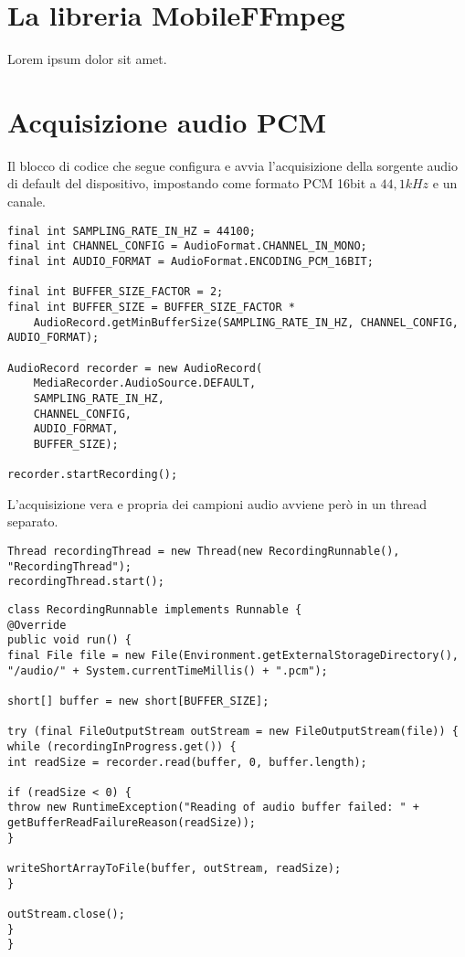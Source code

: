 \chapter{La libreria MobileFFmpeg}
\label{cha:allegato_ffmpeg}

Lorem ipsum dolor sit amet.

\chapter{Acquisizione audio PCM}
\label{cha:allegato_pcm}

Il blocco di codice che segue configura e avvia l'acquisizione della sorgente audio di default del dispositivo, impostando come formato PCM 16bit a $44,1 kHz$ e un canale.

\begin{verbatim}
final int SAMPLING_RATE_IN_HZ = 44100;
final int CHANNEL_CONFIG = AudioFormat.CHANNEL_IN_MONO;
final int AUDIO_FORMAT = AudioFormat.ENCODING_PCM_16BIT;

final int BUFFER_SIZE_FACTOR = 2;
final int BUFFER_SIZE = BUFFER_SIZE_FACTOR *
    AudioRecord.getMinBufferSize(SAMPLING_RATE_IN_HZ, CHANNEL_CONFIG, AUDIO_FORMAT);

AudioRecord recorder = new AudioRecord(
    MediaRecorder.AudioSource.DEFAULT,
    SAMPLING_RATE_IN_HZ,
    CHANNEL_CONFIG,
    AUDIO_FORMAT,
    BUFFER_SIZE);

recorder.startRecording();
\end{verbatim}

L'acquisizione vera e propria dei campioni audio avviene però in un thread separato.

\begin{verbatim}
Thread recordingThread = new Thread(new RecordingRunnable(), "RecordingThread");
recordingThread.start();
\end{verbatim}

\begin{verbatim}
class RecordingRunnable implements Runnable {
@Override
public void run() {
final File file = new File(Environment.getExternalStorageDirectory(), "/audio/" + System.currentTimeMillis() + ".pcm");

short[] buffer = new short[BUFFER_SIZE];

try (final FileOutputStream outStream = new FileOutputStream(file)) {
while (recordingInProgress.get()) {
int readSize = recorder.read(buffer, 0, buffer.length);

if (readSize < 0) {
throw new RuntimeException("Reading of audio buffer failed: " + getBufferReadFailureReason(readSize));
}

writeShortArrayToFile(buffer, outStream, readSize);
}

outStream.close();
}
}
\end{verbatim}

